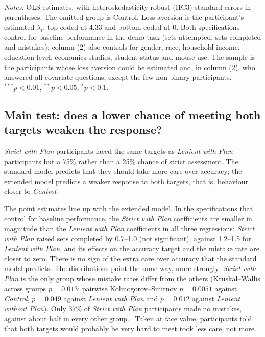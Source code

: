 \documentclass[12pt, letterpaper]{article}
\newcommand{\CtrlName}{Control}
\newcommand{\LPName}{Lenient with Plan}
\newcommand{\SPName}{Strict with Plan}
\newcommand{\LNName}{Lenient without Plan}
\newcommand{\Ctrl}{\textit{\CtrlName}}
\newcommand{\LP}{\textit{\LPName}}
\newcommand{\SP}{\textit{\SPName}}
\newcommand{\LN}{\textit{\LNName}}
\begin{document}
\begin{table}[htbp]
\centering
\caption{Treatment effects on sets completed, interacted with loss aversion}\label{tab:reg-sets-la}
\begin{threeparttable}

\begin{tablenotes}[flushleft]
\footnotesize
\item \textit{Notes:} OLS estimates, with heteroskedasticity-robust (HC3) standard errors in parentheses. The omitted group is Control. Loss aversion is the participant's estimated $\lambda_i$, top-coded at 4.33 and bottom-coded at 0. Both specifications control for baseline performance in the demo task (sets attempted, sets completed and mistakes); column (2) also controls for gender, race, household income, education level, economics studies, student status and mouse use. The sample is the participants whose loss aversion could be estimated and, in column (2), who answered all covariate questions, except the few non-binary participants. $^{***}p<0.01$, $^{**}p<0.05$, $^{*}p<0.1$.
\end{tablenotes}
\end{threeparttable}
\end{table}

\subsection{Main test: does a lower chance of meeting both targets weaken the response?}

\SP{} participants faced the same targets as \LP{} participants but a 75\% rather than a 25\% chance of strict assessment. The standard model predicts that they should take more care over accuracy; the extended model predicts a weaker response to both targets, that is, behaviour closer to \Ctrl{}.

The point estimates line up with the extended model. In the specifications that control for baseline performance, the \SP{} coefficients are smaller in magnitude than the \LP{} coefficients in all three regressions: \SP{} raised sets completed by 0.7--1.0 (not significant), against 1.2--1.5 for \LP{}, and its effects on the accuracy target and the mistake rate are closer to zero. There is no sign of the extra care over accuracy that the standard model predicts. The distributions point the same way, more strongly: \SP{} is the only group whose mistake rates differ from the others (Kruskal--Wallis across groups $p = 0.013$; pairwise Kolmogorov--Smirnov $p = 0.0051$ against \Ctrl{}, $p = 0.049$ against \LP{} and $p = 0.012$ against \LN{}). Only 37\% of \SP{} participants made no mistakes, against about half in every other group.%
\ Taken at face value, participants told that both targets would probably be very hard to meet took less care, not more.
\end{document}
